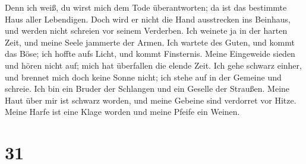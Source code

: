  Denn ich weiß, du wirst mich dem Tode überantworten; da
ist das bestimmte Haus aller Lebendigen.  Doch wird er
nicht die Hand ausstrecken ins Beinhaus, und werden nicht schreien vor
seinem Verderben.  Ich weinete ja in der harten Zeit, und
meine Seele jammerte der Armen.  Ich wartete des Guten, und
kommt das Böse; ich hoffte aufs Licht, und kommt Finsternis.
 Meine Eingeweide sieden und hören nicht auf; mich hat
überfallen die elende Zeit.  Ich gehe schwarz einher, und
brennet mich doch keine Sonne nicht; ich stehe auf in der Gemeine und
schreie.  Ich bin ein Bruder der Schlangen und ein Geselle
der Straußen.  Meine Haut über mir ist schwarz worden, und
meine Gebeine sind verdorret vor Hitze.  Meine Harfe ist
eine Klage worden und meine Pfeife ein Weinen.

\hypertarget{section-30}{%
\section{31}\label{section-30}}

